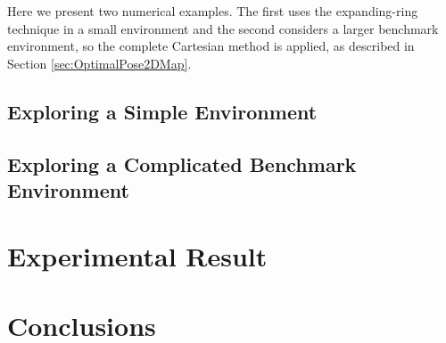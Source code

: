 Here we present two numerical examples. The first uses the expanding-ring technique in a small environment and the second considers a larger benchmark environment, so the complete Cartesian method is applied, as described in Section \ref{sec:OptimalPose2DMap}.

\subsection{Exploring a Simple Environment}




\subsection{Exploring a Complicated Benchmark Environment}

\section{Experimental Result}

\section{Conclusions}


